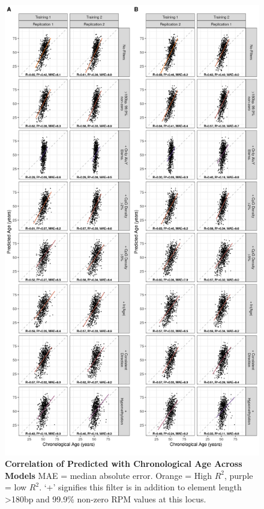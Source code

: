 \documentclass[
]{book}
\begin{document}
\begin{figure}

{\centering \includegraphics[width=0.95\linewidth]{./figs/corplots_panel_split} 

}

\caption{\textbf{Correlation of Predicted with Chronological Age Across Models} MAE = median absolute error. Orange = High \(R^2\), purple = low \(R^2\). `+' signifies this filter is in addition to element length \textgreater180bp and 99.9\% non-zero RPM values at this locus.}\label{fig:corplotsPanelSplit}
\end{figure}
\end{document}
